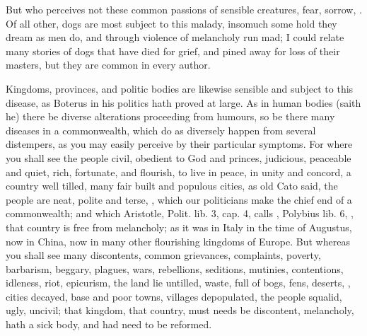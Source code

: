 {But who perceives not these common passions of sensible creatures,
fear, sorrow, \etc{}. Of all other, dogs are most subject to this malady,
insomuch some hold they dream as men do, and through violence of
melancholy run mad; I could relate many stories of dogs that have died
for grief, and pined away for loss of their masters, but they are
common in every author.

Kingdoms, provinces, and politic bodies are likewise sensible and
subject to this disease, as Boterus in his politics hath proved at
large. As in human bodies (saith he) there be diverse alterations
proceeding from humours, so be there many diseases in a commonwealth,
which do as diversely happen from several distempers, as you may easily
perceive by their particular symptoms. For where you shall see the
people civil, obedient to God and princes, judicious, peaceable and
quiet, rich, fortunate, and flourish, to live in peace, in unity
and concord, a country well tilled, many fair built and populous
cities,  as old Cato said, the people are neat,
polite and terse, , which our politicians make
the chief end of a commonwealth; and which  Aristotle, Polit. lib.
3, cap. 4, calls , Polybius lib. 6, , that country is free from melancholy; as it was in Italy in the
time of Augustus, now in China, now in many other flourishing kingdoms
of Europe. But whereas you shall see many discontents, common
grievances, complaints, poverty, barbarism, beggary, plagues, wars,
rebellions, seditions, mutinies, contentions, idleness, riot,
epicurism, the land lie untilled, waste, full of bogs, fens, deserts,
\etc{}, cities decayed, base and poor towns, villages depopulated, the
people squalid, ugly, uncivil; that kingdom, that country, must needs
be discontent, melancholy, hath a sick body, and had need to be
reformed.

}
